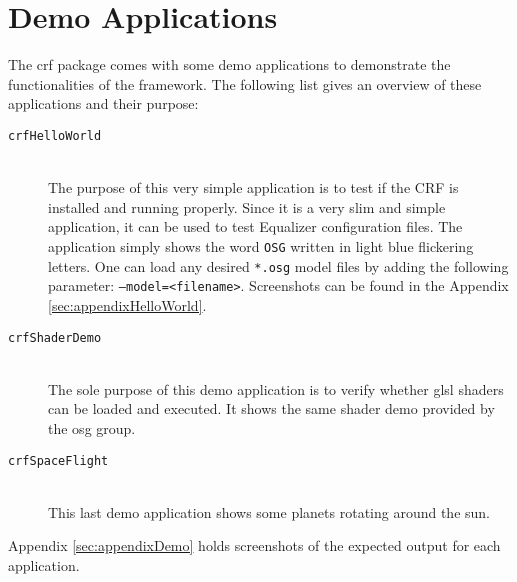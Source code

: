\chapter{Demo Applications}

The \gls{crf} package comes with some demo applications to demonstrate the functionalities of the framework. The following list gives an overview of these applications and their purpose:

\begin{description}
	\item[\texttt{crfHelloWorld}]\hfill\\
		The purpose of this very simple application is to test if the CRF is installed and running properly. Since it is a very slim and simple application, it can be used to test Equalizer configuration files. The application simply shows the word \texttt{OSG} written in light blue flickering letters. One can load any desired \texttt{*.osg} model files by adding the following parameter: \texttt{--model=<filename>}. Screenshots can be found in the Appendix \ref{sec:appendixHelloWorld}.
	\item[\texttt{crfShaderDemo}]\hfill\\
		The sole purpose of this demo application is to verify whether \gls{glsl} shaders can be loaded and executed. It shows the same shader demo provided by the \gls{osg} group.
	\item[\texttt{crfSpaceFlight}]\hfill\\
		This last demo application shows some planets rotating around the sun.
\end{description}

Appendix \ref{sec:appendixDemo} holds screenshots of the expected output for each application.
